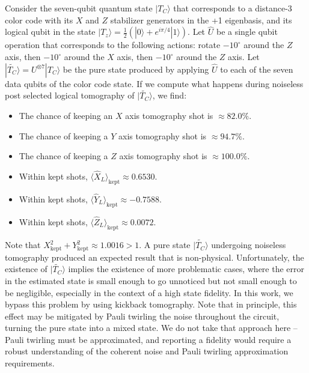 Consider the seven-qubit quantum state $|T_C\rangle$ that corresponds to a distance-3 color code with its $X$ and $Z$ stabilizer generators in the +1 eigenbasis, and its logical qubit in the state $|T_z \rangle = \frac{1}{2}\left(|0\rangle + e^{i\pi/4}|1\rangle\right)$.
Let $\hat{U}$ be a single qubit operation that corresponds to the following actions: rotate $-10^\circ$ around the $Z$ axis, then $-10^\circ$ around the $X$ axis, then $-10^\circ$ around the $Z$ axis.
Let $|\widetilde{T_C}\rangle = U^{\otimes 7} |T_C\rangle$ be the pure state produced by applying $\hat{U}$ to each of the seven data qubits of the color code state.
If we compute what happens during noiseless post selected logical tomography of $|\widetilde{T_C}\rangle$, we find:

\begin{itemize}
    \item The chance of keeping an $X$ axis tomography shot is $\approx 82.0\%$.
    \item The chance of keeping a $Y$ axis tomography shot is $\approx 94.7\%$.
    \item The chance of keeping a $Z$ axis tomography shot is $\approx 100.0\%$.
    \item Within kept shots, $\langle \hat{X}_L \rangle_\text{kept} \approx 0.6530$.
    \item Within kept shots, $\langle \hat{Y}_L \rangle_\text{kept} \approx -0.7588$.
    \item Within kept shots, $\langle \hat{Z}_L \rangle_\text{kept} \approx 0.0072$.
\end{itemize}

Note that $X_\text{kept}^2 + Y_\text{kept}^2 \approx 1.0016 > 1$.
A pure state $|\widetilde{T_C}\rangle$ undergoing noiseless tomography produced an expected result that is non-physical.
Unfortunately, the existence of $|\widetilde{T_C}\rangle$ implies the existence of more problematic cases, where the error in the estimated state is small enough to go unnoticed but not small enough to be negligible, especially in the context of a high state fidelity. 
In this work, we bypass this problem by using kickback tomography. Note that in principle, this effect may be mitigated by Pauli twirling the noise throughout the circuit, turning the pure state into a mixed state. We do not take that approach here -- Pauli twirling must be approximated, and reporting a fidelity would require a robust understanding of the coherent noise and Pauli twirling approximation requirements.  

